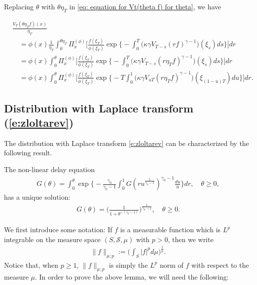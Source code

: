 	Replacing $\theta$ with $\theta \eta_T$ in \eqref{eq: equation for Vt(theta f) for theta}, we have

\begin{align}\label{eq: equation for normalized V_T}
	&\frac{V_T(\theta \eta_T f)(x)}{\eta_T}
	\\&\quad= \phi(x) \frac{1}{\eta_T}\int_0^{\theta \eta_T} \Pi_x^{(\phi)} \Big[ \frac { f(\xi_T) } { \phi(\xi_T) } \exp\Big\{-\int_0^T \big(\kappa\gamma V_{T-s}(r f)^{\gamma-1}\big)(\xi_s) ds\Big\}\Big] dr
	\\&\quad = \phi(x) \int_0^{\theta} \Pi_x^{(\phi)} \Big[ \frac { f(\xi_T) } { \phi(\xi_T) }  \exp\Big\{-\int_0^T \big(\kappa\gamma V_{T-s}(r \eta_T f)^{\gamma-1}\big)(\xi_s) ds\Big\}\Big] dr
	\\&\quad = \phi(x)\int_0^{\theta} \Pi_x^{(\phi)} \Big[\frac{f(\xi_T)}{\phi(\xi_T)} \exp\Big\{-T\int_0^1 \big(\kappa\gamma V_{uT}(r \eta_T f)^{\gamma-1}\big)(\xi_{(1-u)T}) du\Big\}\Big] dr.
\end{align}

\subsection{Distribution with Laplace transform (\ref{e:zloltarev})}
\label{sec: Characterizing the Zolotarev's distribution using an non-linear delay equation}

The distribution with Laplace transform \eqref{e:zloltarev} can be characterized by the
following result.

\begin{lem} \label{lem: characterize the general Mittag-Leffler distribution}
	The non-linear delay equation
\begin{align} \label{eq: equation for the distribution}
	G( \theta)
	= \int_0^\theta \exp\Big\{ - \frac{\gamma_0} {\gamma_0 - 1} \int_0^1 G(ru^{\frac{1}{\gamma_0 - 1} })^{\gamma_0 - 1}\frac{du}{u} \Big\} dr,
	\quad \theta \geq 0,
\end{align}
	has a unique solution:
\begin{align}\label{eq: solution for the equation}
	G(\theta)
	= \Big(\frac{1}{1+\theta^{-(\gamma_0 - 1)}}\Big)^{\frac{1}{\gamma_0 - 1}},
	\quad \theta \geq 0.
\end{align}
\end{lem}

	We first introduce some notation:
	If $f$ is a measurable function which is $L^p$ integrable on the measure space $(S,\mathscr S,\mu)$ with $p > 0$, then we write
\begin{align}
	\|f\|_{\mu;p}
	:= \Big(\int_{S} |f|^p d\mu \Big)^{\frac{1}{p}}.
\end{align}
	Notice that, when $p\geq 1$, $\|f\|_{\mu;p}$ is simply the $L^p$ norm of $f$ with respect to the measure $\mu$.	
	In order to prove the above lemma, we will need the following:

